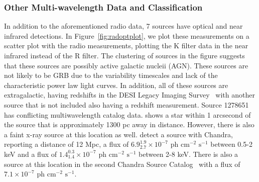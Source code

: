 \documentclass[12pt]{article}
\begin{document}
\subsubsection{Other Multi-wavelength Data and Classification}
In addition to the aforementioned radio data, 7 sources have optical and near infrared detections. In Figure~\ref{fig:radoptplot}, we plot these measurements on a scatter plot with the radio measurements, plotting the K filter data in the near infrared instead of the R filter. The clustering of sources in the figure suggests that these sources are possibly active galactic nucleii (AGN). These sources are not likely to be GRB due to the variability timescales and lack of the characteristic power law light curves. In addition, all of these sources are extragalactic, having redshifts in the DESI Legacy Imaging Survey~\citep{10.1093...mnras...stac608} with another source that is not included also having a redshift measurement. Source 1278651 has conflicting multiwavelength catalog data. \citet{2021AJ....161..147B} shows a star within 1 arcsecond of the source that is approximately 1300 pc away in distance. However, there is also a faint x-ray source at this location as well. \citet{2011ApJS..192...10L} detect a source with Chandra, reporting a distance of 12 Mpc, a flux of $6.9^{1.9}_{2.7}\times10^{-7}\text{ ph}\text{ cm}^{-2}\text{ s}^{-1}$ between 0.5-2 keV and a flux of $1.4^{0.3}_{1.4}\times10^{-7}\text{ ph}\text{ cm}^{-2}\text{ s}^{-1}$ between 2-8 keV. There is also a source at this location in the second Chandra Source Catalog~\citep{2010ApJS..189...37E} with a flux of $7.1\times10^{-7}\text{ ph} \text{ cm}^{-2}\text{ s}^{-1}$. 
\end{document}
